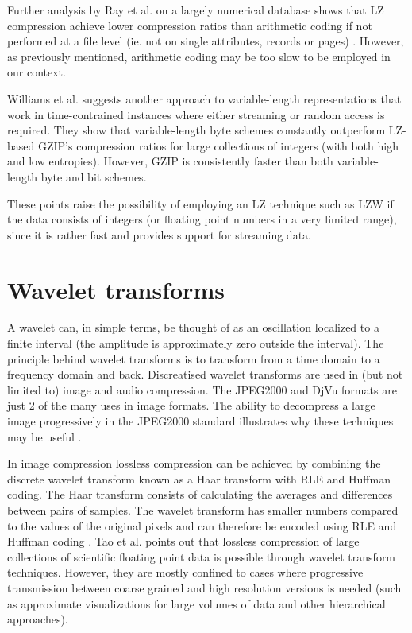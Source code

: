 \documentclass{acm_proc_article-sp}
\begin{document}
Further analysis by Ray et al. \cite{ray1995database} on a largely numerical database shows that LZ compression achieve lower compression ratios than arithmetic coding if not performed at a file level (ie. 
not on single attributes, records or pages) . However, as previously mentioned, arithmetic coding may be too slow to be employed in our context.

Williams et al. \cite{williams1999compressing} suggests another approach to variable-length representations that work in time-contrained instances where either streaming or random access is required. They show that
variable-length byte schemes constantly outperform LZ-based GZIP's compression ratios for large collections of integers (with both high and low entropies). However, GZIP is consistently
faster than both variable-length byte and bit schemes.

These points raise the possibility of employing an LZ technique such as LZW if the data consists of integers (or floating point numbers in a very limited range), since it is rather fast
and provides support for streaming data.
\section{Wavelet transforms}
A wavelet can, in simple terms, be thought of as an oscillation localized to a finite interval (the amplitude is approximately zero outside the interval). The principle behind wavelet transforms is to transform from a time 
domain to a frequency domain and back. Discreatised wavelet transforms are used in (but not limited to) image and audio compression. The JPEG2000 and DjVu formats are just 2 of the many uses in image formats. The ability to 
decompress a large image progressively in the JPEG2000 standard illustrates why these techniques may be useful \cite[ch 5]{salomon2004data}\cite{952804}. 

In image compression lossless compression can be achieved by combining the discrete wavelet transform known as a Haar transform with RLE and Huffman coding. The Haar transform consists of calculating the averages and differences between 
pairs of samples. The wavelet transform has smaller numbers compared to the values of the original pixels and can therefore be encoded using RLE and Huffman coding \cite[ch 5]{salomon2004data}. Tao et al. 
\cite{Tao:1994:PTS:951087.951108} points out that lossless compression of large collections of scientific floating point data is possible through wavelet transform techniques. However, they are mostly confined to cases where progressive 
transmission between coarse grained and high resolution versions is needed (such as approximate visualizations for large volumes of data and other hierarchical approaches). 
\end{document}
